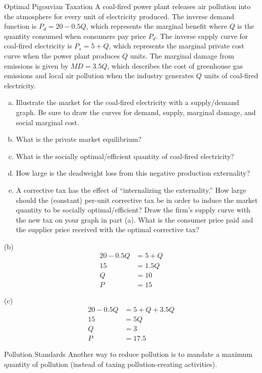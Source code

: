 \documentclass[8pt]{extarticle}
\title{}
\author{Avinash Iyer}
\date{}
\begin{document}
  \begin{problem}{Optimal Pigouvian Taxation}
    A coal-fired power plant releases air pollution into the atmosphere for every unit of electricity produced. The inverse demand function is $P_d = 20 - 0.5Q$, which represents the marginal benefit where $Q$ is the quantity consumed when consumers pay price $P_d$. The inverse supply curve for coal-fired electricity is $P_s = 5 + Q$, which represents the marginal private cost curve when the power plant produces $Q$ units. The marginal damage from emissions is given by $MD = 3.5Q$, which describes the cost of greenhouse gas emissions and local air pollution when the industry generates $Q$ units of coal-fired electricity.
    \begin{enumerate}[(a)]
      \item Illustrate the market for the coal-fired electricity with a supply/demand graph. Be sure to draw the curves for demand, supply, marginal damage, and social marginal cost.
      \item What is the private market equilibrium?
      \item What is the socially optimal/efficient quantity of coal-fired electricity?
      \item How large is the deadweight loss from this negative production externality?
      \item A corrective tax has the effect of ``internalizing the externality.'' How large should the (constant) per-unit corrective tax be in order to induce the market quantity to be socially optimal/efficient? Draw the firm's supply curve with the new tax on your graph in part (a). What is the consumer price paid and the supplier price received with the optimal corrective tax?
    \end{enumerate}
    \tcblower
    \begin{problem}{(b)}
      \begin{align*}
        20-0.5Q &= 5 + Q\\
        15 &= 1.5Q\\
        Q &= 10\\
        P &= 15
      \end{align*}
    \end{problem}
    \begin{problem}{(c)}
      \begin{align*}
        20-0.5Q &= 5+Q+3.5Q\\
        15 &= 5Q\\
        Q &= 3\\
        P &= 17.5
      \end{align*}
    \end{problem}
  \end{problem}
  \begin{problem}{Pollution Standards}
    Another way to reduce pollution is to mandate a maximum quantity of pollution (instead of taxing pollution-creating activities). 
  \end{problem}
\end{document}
